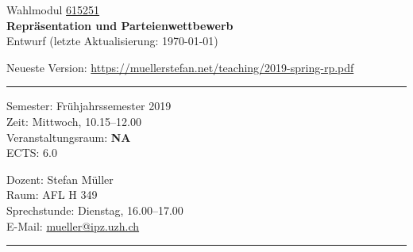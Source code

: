 \documentclass[abstract=on,parskip=full,headings=standardclasses,fontsize=11pt,paper=a4]{scrartcl}
\begin{document}
	
\singlespacing


\noindent
{}%
\hfill%

\singlespacing
\vspace{1cm}

\begin{center}
{\large Wahlmodul \href{https://studentservices.uzh.ch/uzh/anonym/vvz/index.html#/details/2018/004/E/50926420}{615251}} \\ 
\medskip
{\Large \textbf{Repräsentation und Parteienwettbewerb}} \\
\bigskip
{\large  Entwurf (letzte Aktualisierung: \today)}

Neueste Version: \url{https://muellerstefan.net/teaching/2019-spring-rp.pdf}
\end{center}

\vspace{1.5cm}

\hrule
\medskip
\begin{minipage}[t]{0.5\textwidth}
Semester: Frühjahrssemester 2019 \\
Zeit: Mittwoch, 10.15--12.00 \\
Veranstaltungsraum:  \textbf{NA}\\
ECTS: 6.0
\end{minipage}
\begin{minipage}[t]{0.49\textwidth}
\begin{flushright}
Dozent: Stefan Müller \\
Raum: AFL H 349\\
Sprechstunde: Dienstag, 16.00--17.00 \\
E-Mail: \textsf{\href{mailto:mueller@ipz.uzh.ch}{mueller@ipz.uzh.ch}}
\end{flushright}
\end{minipage}
\medskip
\vspace{2.5mm}
\hrule 
\end{document}
